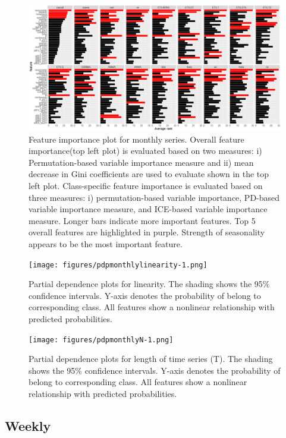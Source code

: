 \documentclass[11pt,a4paper,]{article}
\begin{document}
\begin{figure}
\centering
\includegraphics{figures/vimonthly-1.png}
\caption{\label{fig:vimonthly}Feature importance plot for monthly series.
Overall feature importance(top left plot) is evaluated based on two
measures: i) Permutation-based variable importance measure and ii) mean
decrease in Gini coefficients are used to evaluate shown in the top left
plot. Class-specific feature importance is evaluated based on three
measures: i) permutation-based variable importance, PD-based variable
importance measure, and ICE-based variable importance measure. Longer
bars indicate more important features. Top 5 overall features are
highlighted in purple. Strength of seasonality appears to be the most
important feature.}
\end{figure}

\begin{figure}
\centering
\texttt{[image: figures/pdpmonthlylinearity-1.png]}
\caption{\label{fig:pdpmonthlylinearity}Partial dependence plots for
linearity. The shading shows the 95\% confidence intervals. Y-axis
denotes the probability of belong to corresponding class. All features
show a nonlinear relationship with predicted probabilities.}
\end{figure}

\begin{figure}
\centering
\texttt{[image: figures/pdpmonthlyN-1.png]}
\caption{\label{fig:pdpmonthlyN}Partial dependence plots for length of time
series (T). The shading shows the 95\% confidence intervals. Y-axis
denotes the probability of belong to corresponding class. All features
show a nonlinear relationship with predicted probabilities.}
\end{figure}

\subsection{Weekly}\label{weekly}
\end{document}

